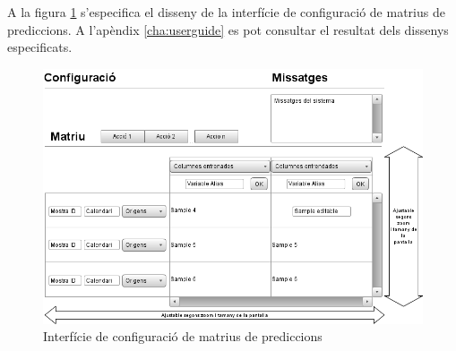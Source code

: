 A la figura \ref{fig:interfacematrixpredictionconf} s'especifica el disseny de la interfície de configuraci\'{o} de matrius de prediccions. A l'apèndix \ref{cha:userguide} es pot consultar el resultat dels dissenys especificats.

\begin{figure}[H]
  \centering
  \includegraphics[scale=0.5]{img/design/Interficiedeconfiguraciopredi.png}
  \caption{Interfície de configuració de matrius de prediccions}
  \label{fig:interfacematrixpredictionconf}
\end{figure}
